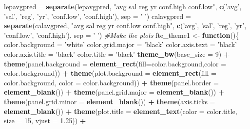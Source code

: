 \documentclass[]{article}
\newenvironment{Shaded}{\begin{snugshade}}{\end{snugshade}}
\newcommand{\KeywordTok}[1]{\textcolor[rgb]{0.13,0.29,0.53}{\textbf{#1}}}
\newcommand{\DataTypeTok}[1]{\textcolor[rgb]{0.13,0.29,0.53}{#1}}
\newcommand{\DecValTok}[1]{\textcolor[rgb]{0.00,0.00,0.81}{#1}}
\newcommand{\FloatTok}[1]{\textcolor[rgb]{0.00,0.00,0.81}{#1}}
\newcommand{\StringTok}[1]{\textcolor[rgb]{0.31,0.60,0.02}{#1}}
\newcommand{\CommentTok}[1]{\textcolor[rgb]{0.56,0.35,0.01}{\textit{#1}}}
\newcommand{\ControlFlowTok}[1]{\textcolor[rgb]{0.13,0.29,0.53}{\textbf{#1}}}
\newcommand{\OperatorTok}[1]{\textcolor[rgb]{0.81,0.36,0.00}{\textbf{#1}}}
\newcommand{\NormalTok}[1]{#1}
\begin{document}
\begin{Shaded}
\begin{Highlighting}[]
\NormalTok{lepavgpred =}\StringTok{ }\KeywordTok{separate}\NormalTok{(lepavgpred, }\StringTok{"avg sal reg yr conf.high conf.low"}\NormalTok{, }\KeywordTok{c}\NormalTok{(}\StringTok{'avg'}\NormalTok{, }\StringTok{'sal'}\NormalTok{, }\StringTok{'reg'}\NormalTok{, }\StringTok{'yr'}\NormalTok{, }\StringTok{'conf.low'}\NormalTok{, }\StringTok{'conf.high'}\NormalTok{), }\DataTypeTok{sep =} \StringTok{' '}\NormalTok{)}
\NormalTok{calavgpred =}\StringTok{ }\KeywordTok{separate}\NormalTok{(calavgpred, }\StringTok{"avg sal reg yr conf.low conf.high"}\NormalTok{, }\KeywordTok{c}\NormalTok{(}\StringTok{'avg'}\NormalTok{, }\StringTok{'sal'}\NormalTok{, }\StringTok{'reg'}\NormalTok{, }\StringTok{'yr'}\NormalTok{, }\StringTok{'conf.low'}\NormalTok{, }\StringTok{'conf.high'}\NormalTok{), }\DataTypeTok{sep =} \StringTok{' '}\NormalTok{)}
\CommentTok{#Make the plots}
\NormalTok{fte_theme1 <-}\StringTok{ }\ControlFlowTok{function}\NormalTok{()\{}
\NormalTok{  color.background =}\StringTok{ 'white'}
\NormalTok{  color.grid.major =}\StringTok{ 'black'}
\NormalTok{  color.axis.text =}\StringTok{ 'black'}
\NormalTok{  color.axis.title =}\StringTok{ 'black'}
\NormalTok{  color.title =}\StringTok{ 'black'}
  \KeywordTok{theme_bw}\NormalTok{(}\DataTypeTok{base_size =} \DecValTok{9}\NormalTok{) }\OperatorTok{+}\StringTok{ }
\StringTok{    }\KeywordTok{theme}\NormalTok{(}\DataTypeTok{panel.background =} \KeywordTok{element_rect}\NormalTok{(}\DataTypeTok{fill=}\NormalTok{color.background,}\DataTypeTok{color =}\NormalTok{ color.background)) }\OperatorTok{+}
\StringTok{    }\KeywordTok{theme}\NormalTok{(}\DataTypeTok{plot.background =} \KeywordTok{element_rect}\NormalTok{(}\DataTypeTok{fill =}\NormalTok{ color.background, }\DataTypeTok{color =}\NormalTok{ color.background)) }\OperatorTok{+}
\StringTok{    }\KeywordTok{theme}\NormalTok{(}\DataTypeTok{panel.border =} \KeywordTok{element_blank}\NormalTok{()) }\OperatorTok{+}
\StringTok{    }\KeywordTok{theme}\NormalTok{(}\DataTypeTok{panel.grid.major =} \KeywordTok{element_blank}\NormalTok{()) }\OperatorTok{+}\StringTok{ }
\StringTok{    }\KeywordTok{theme}\NormalTok{(}\DataTypeTok{panel.grid.minor =} \KeywordTok{element_blank}\NormalTok{()) }\OperatorTok{+}\StringTok{ }
\StringTok{    }\KeywordTok{theme}\NormalTok{(}\DataTypeTok{axis.ticks =} \KeywordTok{element_blank}\NormalTok{()) }\OperatorTok{+}
\StringTok{    }\KeywordTok{theme}\NormalTok{(}\DataTypeTok{plot.title =} \KeywordTok{element_text}\NormalTok{(}\DataTypeTok{color =}\NormalTok{ color.title, }\DataTypeTok{size =} \DecValTok{15}\NormalTok{, }\DataTypeTok{vjust =} \FloatTok{1.25}\NormalTok{)) }\OperatorTok{+}

\end{Highlighting}
\end{Shaded}
\end{document}
